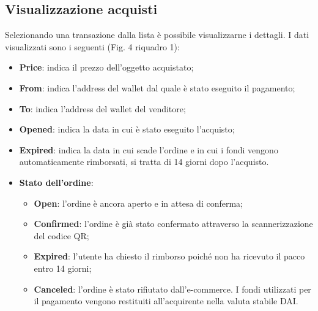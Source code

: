 \documentclass[a4paper, 12pt]{article}
\begin{document}
\subsection{Visualizzazione acquisti}
Selezionando una transazione dalla lista è possibile visualizzarne i dettagli. I dati visualizzati sono i  seguenti (Fig. 4 riquadro 1):
\begin{itemize}
\item \textbf{Price}: indica il prezzo dell'oggetto acquistato;
\item \textbf{From}: indica l'address del wallet dal quale è stato eseguito il pagamento;
\item \textbf{To}: indica l'address del wallet del venditore;
\item \textbf{Opened}: indica la data in cui è stato eseguito l'acquisto;
\item \textbf{Expired}: indica la data in cui scade l'ordine e in cui i fondi vengono automaticamente rimborsati, si tratta di 14 giorni dopo l'acquisto.
\item \textbf{Stato dell'ordine}:
  \begin{itemize}
    \item \textbf{Open}: l'ordine è ancora aperto e in attesa di conferma;
    \item \textbf{Confirmed}: l'ordine è già stato confermato attraverso la scannerizzazione del codice QR;
    \item \textbf{Expired}: l'utente ha chiesto il rimborso poiché non ha ricevuto il pacco entro 14 giorni;
    \item \textbf{Canceled}: l'ordine è stato rifiutato dall'e-commerce. I fondi utilizzati per il pagamento vengono restituiti all'acquirente nella valuta stabile DAI.
  \end{itemize}
\end{itemize}
\end{document}
